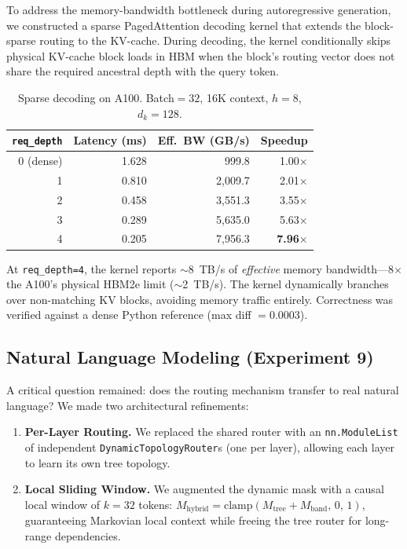 \documentclass[11pt,a4paper]{article}
\begin{document}
To address the memory-bandwidth bottleneck during autoregressive generation, we constructed a sparse PagedAttention decoding kernel that extends the block-sparse routing to the KV-cache. During decoding, the kernel conditionally skips physical KV-cache block loads in HBM when the block's routing vector does not share the required ancestral depth with the query token.

\begin{table}[h]
\centering
\caption{Sparse decoding on A100. Batch$=32$, 16K context, $h=8$, $d_k=128$.}
\label{tab:serving}
\begin{tabular}{@{}rrrr@{}}
\toprule
\texttt{req\_depth} & Latency (ms) & Eff.\ BW (GB/s) & Speedup \\
\midrule
0 (dense) & 1.628 & 999.8 & 1.00$\times$ \\
1 & 0.810 & 2,009.7 & 2.01$\times$ \\
2 & 0.458 & 3,551.3 & 3.55$\times$ \\
3 & 0.289 & 5,635.0 & 5.63$\times$ \\
4 & 0.205 & 7,956.3 & \textbf{7.96$\times$} \\
\bottomrule
\end{tabular}
\end{table}

At \texttt{req\_depth=4}, the kernel reports $\sim$8~TB/s of \emph{effective} memory bandwidth---8$\times$ the A100's physical HBM2e limit ($\sim$2~TB/s). The kernel dynamically branches over non-matching KV blocks, avoiding memory traffic entirely. Correctness was verified against a dense Python reference (max diff $= 0.0003$).

\subsection{Natural Language Modeling (Experiment 9)}

A critical question remained: does the routing mechanism transfer to real natural language? We made two architectural refinements:

\begin{enumerate}
    \item \textbf{Per-Layer Routing.} We replaced the shared router with an \texttt{nn.ModuleList} of independent \texttt{DynamicTopologyRouter}s (one per layer), allowing each layer to learn its own tree topology.
    \item \textbf{Local Sliding Window.} We augmented the dynamic mask with a causal local window of $k=32$ tokens: $M_{\text{hybrid}} = \text{clamp}(M_{\text{tree}} + M_{\text{band}},\, 0,\, 1)$, guaranteeing Markovian local context while freeing the tree router for long-range dependencies.
\end{enumerate}
\end{document}
